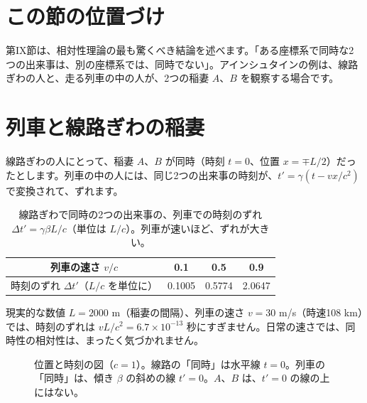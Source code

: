 \documentclass[a4paper,11pt,openany]{ltjsbook}
\begin{document}
\section{この節の位置づけ}

第IX節は、相対性理論の最も驚くべき結論を述べます。「ある座標系で同時な2つの出来事は、別の座標系では、同時でない」。アインシュタインの例は、線路ぎわの人と、走る列車の中の人が、2つの稲妻 $A$、$B$ を観察する場合です。

\section{列車と線路ぎわの稲妻}

線路ぎわの人にとって、稲妻 $A$、$B$ が同時（時刻 $t=0$、位置 $x=\mp L/2$）だったとします。列車の中の人には、同じ2つの出来事の時刻が、$t'=\gamma(t-vx/c^2)$ で変換されて、ずれます。

\begin{table}[htbp]
\centering
\begin{tabular}{c|ccc}
\toprule
列車の速さ $v/c$ & 0.1 & 0.5 & 0.9\\
\midrule
時刻のずれ $\Delta t'$（$L/c$ を単位に）& 0.1005 & 0.5774 & 2.0647\\
\bottomrule
\end{tabular}
\caption{線路ぎわで同時の2つの出来事の、列車での時刻のずれ $\Delta t'=\gamma\beta L/c$（単位は $L/c$）。列車が速いほど、ずれが大きい。}
\end{table}

\begin{examplebox}{現実的な数値}
$L=2000$ m（稲妻の間隔）、列車の速さ $v=30$ m/s（時速108 km）では、時刻のずれは $vL/c^2=6.7\times10^{-13}$ 秒にすぎません。日常の速さでは、同時性の相対性は、まったく気づかれません。
\end{examplebox}

\begin{figure}[htbp]
\centering
{}
\caption{位置と時刻の図（$c=1$）。線路の「同時」は水平線 $t=0$。列車の「同時」は、傾き $\beta$ の斜めの線 $t'=0$。$A$、$B$ は、$t'=0$ の線の上にはない。}
\end{figure}
\end{document}
